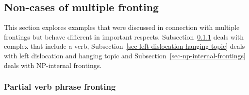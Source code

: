 \subsection{Non-cases of multiple fronting}
\label{sec-keine-mehr-vf-pvp}

This section explores examples that were discussed in connection with multiple frontings but behave
different in important respects. Subsection~\ref{sec-pvp-is-not-mf} deals with complex \vfs that
include a verb, Subsection~\ref{sec-left-dislocation-hanging-topic} deals with left dislocation and
hanging topic and Subsection~\ref{sec-np-internal-frontings} deals with NP-internal
frontings.

\subsubsection{Partial verb phrase fronting}
\label{sec-pvp-is-not-mf}

